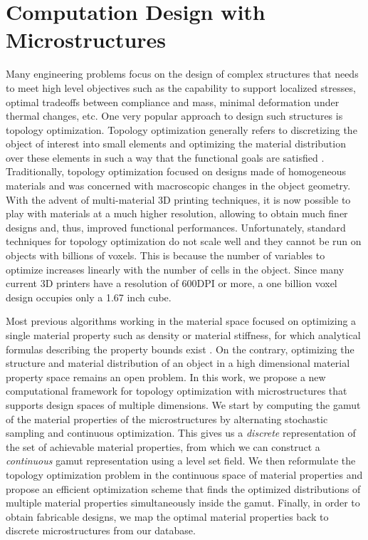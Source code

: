 \chapter{Computation Design with Microstructures}
Many engineering problems focus on the design of complex structures that needs to meet high level objectives such as the capability to support localized stresses, optimal tradeoffs between compliance and mass, minimal deformation under thermal changes, etc. One very popular approach to design such structures is topology optimization.
Topology optimization generally refers to discretizing the object of interest into small elements and optimizing the material distribution over these elements in such a way that the functional goals are satisfied \cite{bendsoe2004topology}. Traditionally, topology optimization focused on designs made of homogeneous materials and was concerned with macroscopic changes in the object geometry.
With the advent of multi-material 3D printing techniques, it is now possible to play with materials at a much higher resolution, allowing to obtain much finer designs and, thus, improved functional performances.
Unfortunately, standard techniques for topology optimization do not scale well and they cannot be run on objects with billions of voxels. This is because the number of variables to optimize increases linearly with the number of cells in the object. Since many current 3D printers have a resolution of 600DPI or more, a one billion voxel design occupies only a 1.67 inch cube.

Most previous algorithms working in the material space focused on optimizing a single material property such as density or material stiffness, for which analytical formulas describing the property bounds exist \cite{Allaire93Bounds}. On the contrary, optimizing the structure and material distribution of an object in a high dimensional material property space remains an open problem. In this work, we propose a new computational framework for topology optimization with microstructures that supports design spaces of multiple dimensions. We start by computing the gamut of the material properties of the microstructures by alternating stochastic sampling and continuous optimization. This gives us a {\it discrete} representation of the set of achievable material properties, from which we can construct a {\it continuous} gamut representation using a level set field. We then reformulate the topology optimization problem in the continuous space of material properties and propose an efficient optimization scheme that finds the optimized distributions of multiple material properties simultaneously inside the gamut.
Finally, in order to obtain fabricable designs, we map the optimal material properties back to discrete microstructures from our database.

